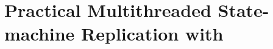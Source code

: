 \newcommand{\smr}[0]{SMR\xspace}
\newcommand{\ldpreload}[0]{LD\_PRELOAD\xspace}
\newcommand{\mutexlock}[0]{\texttt{pthread\_mutex\_lock}\xspace}
\newcommand{\send}[0]{\texttt{send}\xspace}
\newcommand{\accept}[0]{\texttt{accept}\xspace}
\newcommand{\connect}[0]{\texttt{connect}\xspace}
\newcommand{\recv}[0]{\texttt{recv}\xspace}
\newcommand{\sockread}[0]{\texttt{read}\xspace}
\newcommand{\close}[0]{\texttt{close}\xspace}
\newcommand{\select}[0]{\texttt{select}\xspace}
\newcommand{\poll}[0]{\texttt{poll}\xspace}
\newcommand{\epoll}[0]{\texttt{epoll}\xspace}
\newcommand{\randfunc}[0]{\texttt{rand}\xspace}
\newcommand{\srandfunc}[0]{\texttt{srand}\xspace}
\newcommand{\gettimeofday}[0]{\texttt{gettimeofday}\xspace}

\chapter{Practical Multithreaded State-machine Replication with \smt} \label{sec:crane}









